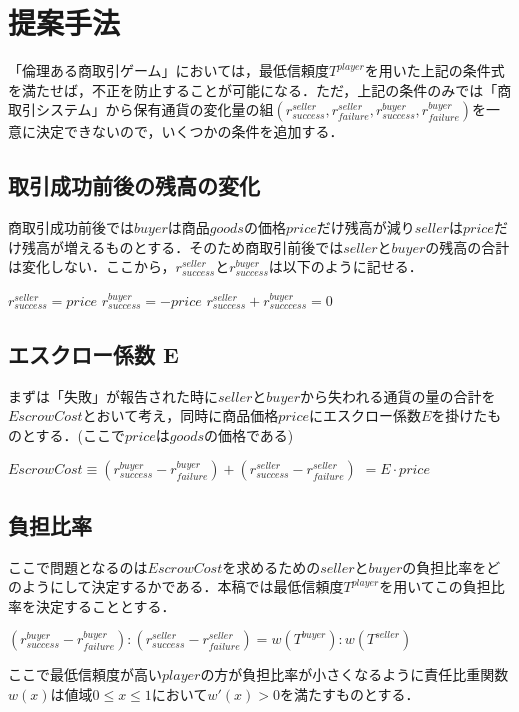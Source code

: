 \section{提案手法}
「倫理ある商取引ゲーム」においては，最低信頼度$ T^{player} $を用いた上記の条件式を満たせば，不正を防止することが可能になる．ただ，上記の条件のみでは「商取引システム」から保有通貨の変化量の組$ (r^{seller}_{success}, r^{seller}_{failure}, r^{buyer}_{success}, r^{buyer}_{failure}) $を一意に決定できないので，いくつかの条件を追加する．


\subsection{取引成功前後の残高の変化}
商取引成功前後では$ buyer $は商品$ goods $の価格$ price $だけ残高が減り$ seller $は$ price $だけ残高が増えるものとする．そのため商取引前後では$ seller $と$ buyer $の残高の合計は変化しない．ここから，$ r^{seller}_{success} $と$ r^{buyer}_{success} $は以下のように記せる．

$ r^{seller}_{success} = price $
$ r^{buyer}_{success} = -price $
$ r^{seller}_{success} + r^{buyer}_{succcess} = 0 $

\subsection{エスクロー係数 E}
まずは「失敗」が報告された時に$ seller $と$ buyer $から失われる通貨の量の合計を$ EscrowCost $とおいて考え，同時に商品価格$ price $にエスクロー係数$ E $を掛けたものとする．(ここで$ price $は$ goods $の価格である)

$ EscrowCost \equiv (r^{buyer}_{success} - r^{buyer}_{failure}) + (r^{seller}_{success} - r^{seller}_{failure}) $
$ = E \cdot price $

\subsection{負担比率}
ここで問題となるのは$ EscrowCost $を求めるための$ seller $と$ buyer $の負担比率をどのようにして決定するかである．本稿では最低信頼度$ T^{player} $を用いてこの負担比率を決定することとする．

$ (r^{buyer}_{success} - r^{buyer}_{failure}):(r^{seller}_{success} - r^{seller}_{failure}) = w(T^{buyer}):w(T^{seller}) $

ここで最低信頼度が高い$ player $の方が負担比率が小さくなるように責任比重関数$ w(x) $は値域$ 0 \leq  x \leq 1 $において$ w'(x)>0 $を満たすものとする．


